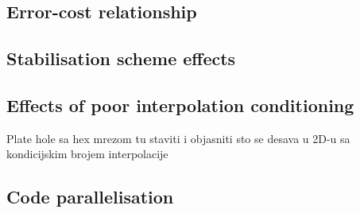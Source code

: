 \documentclass[sn-mathphys,Numbered]{sn-jnl}%
\newcommand{\bb}{\boldsymbol}
\begin{document}
\subsection{Error-cost relationship}

\subsection{Stabilisation scheme effects}

\subsection{Effects of poor interpolation conditioning}

Plate hole sa hex mrezom tu staviti i objasniti sto se desava u 2D-u sa kondicijskim brojem interpolacije

\subsection{Code parallelisation}



\end{document}
